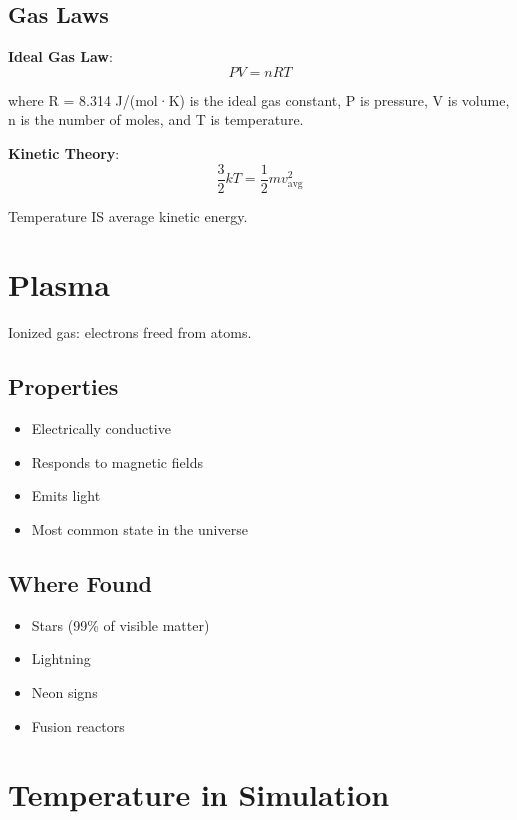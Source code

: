 \documentclass[
  11pt,
  letterpaper,
  twoside,
  openright]{book}
\providecommand{\tightlist}{%
  \setlength{\itemsep}{0pt}\setlength{\parskip}{0pt}}
\begin{document}
\subsection{Gas Laws}\label{gas-laws}

\textbf{Ideal Gas Law}: \[
PV = nRT
\]

where R = 8.314 J/(mol·K) is the ideal gas constant, P is pressure, V is
volume, n is the number of moles, and T is temperature.

\textbf{Kinetic Theory}: \[
\frac{3}{2}kT = \frac{1}{2}mv^2_{\text{avg}}
\]

Temperature IS average kinetic energy.

\section{Plasma}\label{plasma}

Ionized gas: electrons freed from atoms.

\subsection{Properties}\label{properties-4}

\begin{itemize}
\tightlist
\item
  Electrically conductive
\item
  Responds to magnetic fields
\item
  Emits light
\item
  Most common state in the universe
\end{itemize}

\subsection{Where Found}\label{where-found}

\begin{itemize}
\tightlist
\item
  Stars (99\% of visible matter)
\item
  Lightning
\item
  Neon signs
\item
  Fusion reactors
\end{itemize}

\section{Temperature in Simulation}\label{temperature-in-simulation}
\end{document}
